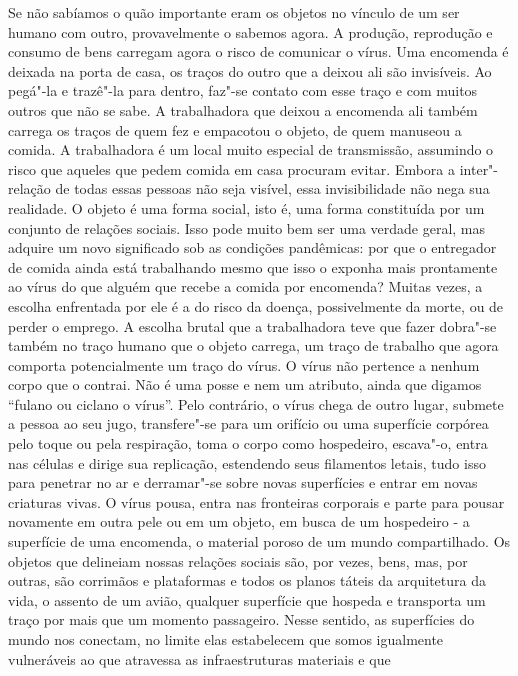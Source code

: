 Se não sabíamos o quão importante eram os objetos no vínculo de um ser
humano com outro, provavelmente o sabemos agora. A produção, reprodução
e consumo de bens carregam agora o risco de comunicar o vírus. Uma
encomenda é deixada na porta de casa, os traços do outro que a deixou
ali são invisíveis. Ao pegá"-la e trazê"-la para dentro, faz"-se contato
com esse traço e com muitos outros que não se sabe. A trabalhadora que
deixou a encomenda ali também carrega os traços de quem fez e empacotou
o objeto, de quem manuseou a comida. A trabalhadora é um local muito
especial de transmissão, assumindo o risco que aqueles que pedem comida
em casa procuram evitar. Embora a inter"-relação de todas essas pessoas
não seja visível, essa invisibilidade não nega sua realidade. O objeto é
uma forma social, isto é, uma forma constituída por um conjunto de
relações sociais. Isso pode muito bem ser uma verdade geral, mas adquire
um novo significado sob as condições pandêmicas: por que o entregador de
comida ainda está trabalhando mesmo que isso o exponha mais prontamente
ao vírus do que alguém que recebe a comida por encomenda? Muitas vezes,
a escolha enfrentada por ele é a do risco da doença, possivelmente da
morte, ou de perder o emprego. A escolha brutal que a trabalhadora teve
que fazer dobra"-se também no traço humano que o objeto carrega, um traço
de trabalho que agora comporta potencialmente um traço do vírus. O vírus
não pertence a nenhum corpo que o contrai. Não é uma posse e nem um
atributo, ainda que digamos ``fulano ou ciclano {} o vírus''.
Pelo contrário, o vírus chega de outro lugar, submete a pessoa ao seu
jugo, transfere"-se para um orifício ou uma superfície corpórea pelo
toque ou pela respiração, toma o corpo como hospedeiro, escava"-o, entra
nas células e dirige sua replicação, estendendo seus filamentos letais,
tudo isso para penetrar no ar e derramar"-se sobre novas superfícies e
entrar em novas criaturas vivas. O vírus pousa, entra nas fronteiras
corporais e parte para pousar novamente em outra pele ou em um objeto,
em busca de um hospedeiro - a superfície de uma encomenda, o material
poroso de um mundo compartilhado. Os objetos que delineiam nossas
relações sociais são, por vezes, bens, mas, por outras, são corrimãos e
plataformas e todos os planos táteis da arquitetura da vida, o assento
de um avião, qualquer superfície que hospeda e transporta um traço por
mais que um momento passageiro. Nesse sentido, as superfícies do mundo
nos conectam, no limite elas estabelecem que somos igualmente
vulneráveis ao que atravessa as infraestruturas materiais e que
